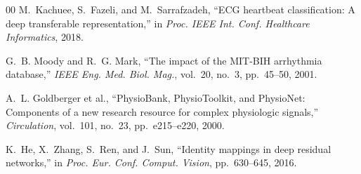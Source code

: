 \documentclass[conference]{IEEEtran}
\begin{document}
\begin{thebibliography}{00}
M.~Kachuee, S.~Fazeli, and M.~Sarrafzadeh, ``ECG heartbeat classification: A deep transferable representation,'' in \textit{Proc. IEEE Int. Conf. Healthcare Informatics}, 2018.

G.~B. Moody and R.~G. Mark, ``The impact of the MIT-BIH arrhythmia database,'' \textit{IEEE Eng. Med. Biol. Mag.}, vol.~20, no.~3, pp.~45--50, 2001.

A.~L. Goldberger et al., ``PhysioBank, PhysioToolkit, and PhysioNet: Components of a new research resource for complex physiologic signals,'' \textit{Circulation}, vol.~101, no.~23, pp.~e215--e220, 2000.

K.~He, X.~Zhang, S.~Ren, and J.~Sun, ``Identity mappings in deep residual networks,'' in \textit{Proc. Eur. Conf. Comput. Vision}, pp.~630--645, 2016.

\end{thebibliography}
\end{document}
